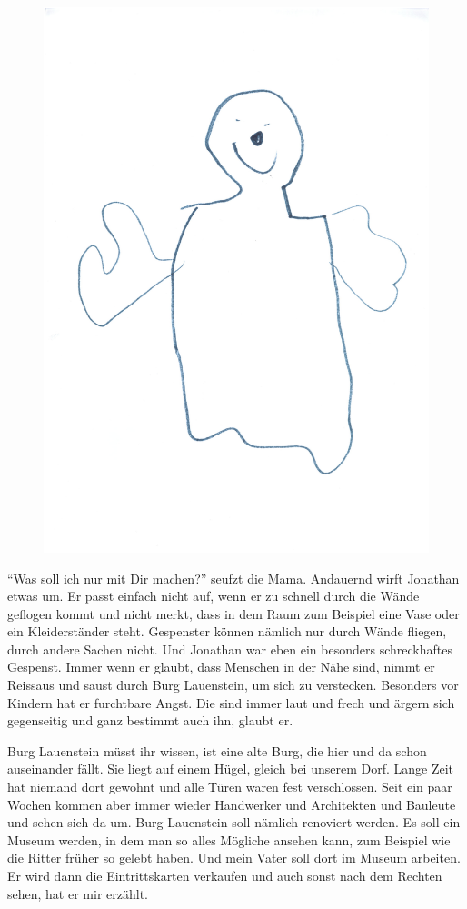 \begin{figure}[hb]
\centering
\includegraphics[width=.7\textwidth]{bilder/gespenst1.pdf}
\end{figure}

\enquote{Was soll ich nur mit Dir machen?} seufzt die Mama. Andauernd wirft Jonathan etwas um. Er passt einfach nicht auf, wenn er zu schnell durch die Wände geflogen kommt und nicht merkt, dass in dem Raum zum Beispiel eine Vase oder ein Kleiderständer steht. Gespenster können nämlich nur durch Wände fliegen, durch andere Sachen nicht. Und Jonathan war eben ein besonders schreckhaftes Gespenst. Immer wenn er glaubt, dass Menschen in der Nähe sind, nimmt er Reissaus und saust durch Burg Lauenstein, um sich zu verstecken. Besonders vor Kindern hat er furchtbare Angst. Die sind immer laut und frech und ärgern sich gegenseitig und ganz bestimmt auch ihn, glaubt er. 
\medskip
\begin{mdframed}[style=mystyle]
Burg Lauenstein müsst ihr wissen, ist eine alte Burg, die hier und da schon auseinander fällt. Sie liegt auf einem Hügel, gleich bei unserem Dorf. Lange Zeit hat niemand dort gewohnt und alle Türen waren fest verschlossen. Seit ein paar Wochen kommen aber immer wieder Handwerker und Architekten und Bauleute und sehen sich da um. Burg Lauenstein soll nämlich renoviert werden. Es soll ein Museum werden, in dem man so alles Mögliche ansehen kann, zum Beispiel wie die Ritter früher so gelebt haben. Und mein Vater soll dort im Museum arbeiten. Er wird dann die Eintrittskarten verkaufen und auch sonst nach dem Rechten sehen, hat er mir erzählt.
\end{mdframed}\medskip

